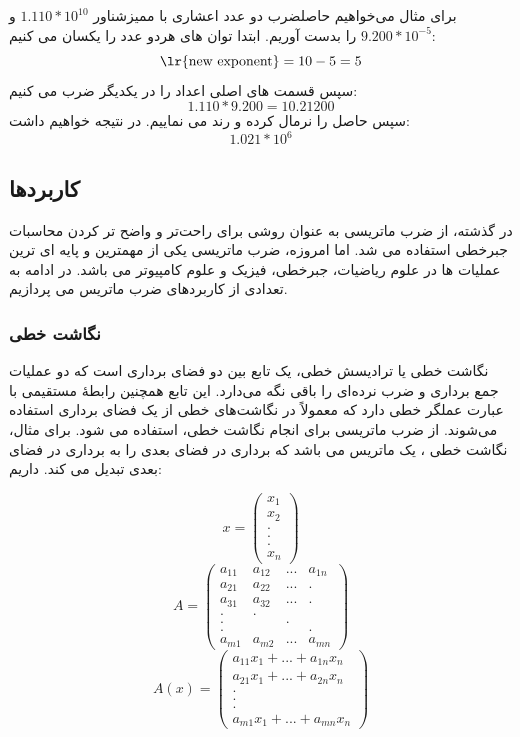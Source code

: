 \documentclass[12pt,titlepage,a4page , tikz , multi,table , svgnames,xcdraw]{article}
\begin{document}
برای مثال می‌خواهیم حاصلضرب دو عدد اعشاری با ممیزشناور 
$1.110 * 10^{10}$
و 
$9.200*10^{-5}$
را بدست آوریم. ابتدا توان های هردو عدد را یکسان می کنیم:
$$\text{\lr{new exponent}} = 10 - 5 = 5$$
سپس قسمت های اصلی اعداد را در یکدیگر ضرب می کنیم:
$$1.110 * 9.200 = 10.21200$$
سپس حاصل را نرمال کرده و رند می نماییم. در نتیجه خواهیم داشت:
$$1.021 * 10^6$$


\cite{Floating_Point_Operationss} \cite{FPArithmatic}

\subsection{کاربردها}
در گذشته، از ضرب ماتریسی به عنوان روشی برای راحت‌تر و واضح تر کردن محاسبات جبرخطی استفاده می شد. اما امروزه، ضرب ماتریسی یکی از مهمترین و پایه ای ترین عملیات ها در علوم ریاضیات، جبرخطی، فیزیک و علوم کامپیوتر می باشد. در ادامه به تعدادی از کاربردهای ضرب ماتریس می پردازیم.

\subsubsection{نگاشت خطی}
نگاشت خطی یا ترادیسش خطی، یک تابع بین دو فضای برداری است که دو عملیات جمع برداری و ضرب نرده‌ای را باقی نگه می‌دارد. این تابع همچنین رابطهٔ مستقیمی با عبارت عملگر خطی دارد که معمولاً در نگاشت‌های خطی از یک فضای برداری استفاده می‌شوند. از ضرب ماتریسی برای انجام نگاشت خطی، استفاده می شود. برای مثال، نگاشت خطی 
، یک ماتریس 
 می باشد که برداری در فضای 
 بعدی را به برداری در فضای 
 بعدی تبدیل می کند. داریم:
\cite{wikipedia}

$$ x = \left( \begin{matrix} x_1 \\ x_2  \\
. \\
. \\
. \\
x_n \end{matrix} \right) $$
$$ A = \left( \begin{matrix} a_{11} & a_{12} & ... & a_{1n} \\
a_{21} & a_{22} & ... & . \\
a_{31} & a_{32} & ... & .\\
. & . \\
. && .\\
. &&& . \\
a_{m1} & a_{m2} & ... & a_{mn}
\end{matrix} \right) $$
$$ A(x) = \left( \begin{matrix} 
a_{11}x_1 + ... + a_{1n}x_n \\
a_{21}x_1 + ... + a_{2n}x_n  \\
. \\
. \\
. \\
a_{m1}x_1 + ... + a_{mn}x_n \end{matrix} \right) $$
\end{document}
